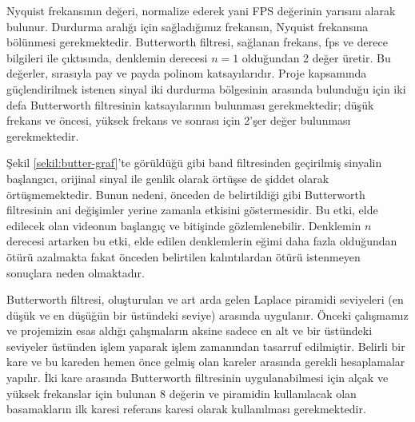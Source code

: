 \documentclass[a4paper, 12pt]{article}
\begin{document}
Nyquist frekansının değeri, normalize ederek yani FPS değerinin yarısını alarak bulunur. Durdurma aralığı için sağladığımız frekansın, Nyquist frekansına bölünmesi gerekmektedir. Butterworth filtresi, sağlanan frekans, fps ve derece bilgileri ile çıktısında, denklemin derecesi $n=1$ olduğundan 2 değer üretir. Bu değerler, sırasıyla pay ve payda polinom katsayılarıdır. Proje kapsamında güçlendirilmek istenen sinyal iki durdurma bölgesinin arasında bulunduğu için iki defa Butterworth filtresinin katsayılarının bulunması gerekmektedir; düşük frekans ve öncesi, yüksek frekans ve sonrası için 2'şer değer bulunması gerekmektedir.  


Şekil \ref{sekil:butter-graf}'te görüldüğü gibi band filtresinden geçirilmiş sinyalin başlangıcı, orijinal sinyal ile genlik olarak örtüşse de şiddet olarak örtüşmemektedir. Bunun nedeni, önceden de belirtildiği gibi Butterworth filtresinin ani değişimler yerine zamanla etkisini göstermesidir. Bu etki, elde edilecek olan videonun başlangıç ve bitişinde gözlemlenebilir. Denklemin $n$ derecesi artarken bu etki, elde edilen denklemlerin eğimi daha fazla olduğundan ötürü azalmakta fakat önceden belirtilen kalıntılardan ötürü istenmeyen sonuçlara neden olmaktadır. 

Butterworth filtresi, oluşturulan ve art arda gelen Laplace piramidi seviyeleri (en düşük ve en düşüğün bir üstündeki seviye) arasında uygulanır. Önceki çalışmamız ve projemizin esas aldığı çalışmaların aksine sadece en alt ve bir üstündeki seviyeler üstünden işlem yaparak işlem zamanından tasarruf edilmiştir. Belirli bir kare ve bu kareden hemen önce gelmiş olan kareler arasında gerekli hesaplamalar yapılır. İki kare arasında Butterworth filtresinin uygulanabilmesi için alçak ve yüksek frekanslar için bulunan 8 değerin ve piramidin kullanılacak olan basamakların ilk karesi referans karesi olarak kullanılması gerekmektedir. 

% 			

\end{document}
